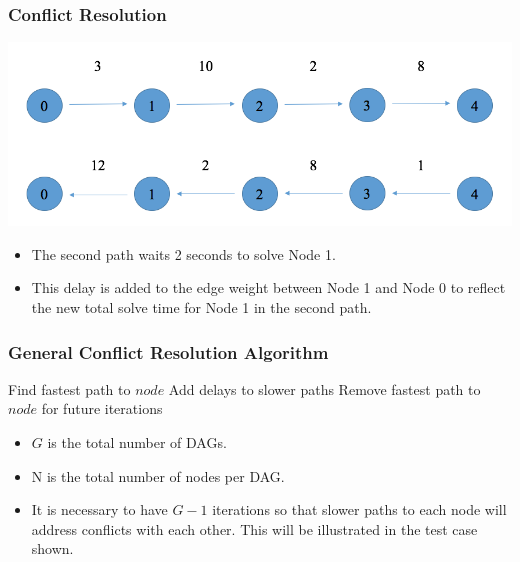 \documentclass[xcolor={usenames,dvipsnames,svgnames,table}]{beamer}
\begin{document}
\begin{frame}[t]\frametitle{Conflict Resolution}
	\centering
	\includegraphics[scale=0.35]{figures/postconflict.png}
	
	\begin{block}{}
	\begin{itemize}
		\item The second path waits 2 seconds to solve Node 1.
		\item This delay is added to the edge weight between Node 1 and Node 0 to reflect the new total solve time for Node 1 in the second path.
	\end{itemize}
	\end{block}
	
\end{frame}

\begin{frame}[t]\frametitle{General Conflict Resolution Algorithm}
\begin{algorithm}[H]
\begin{algorithmic}[1]
\STATE Find fastest path to $node$
\STATE Add delays to slower paths
\STATE Remove fastest path to $node$ for future iterations
\ENDFOR
\ENDFOR	
\label{conflict}
\end{algorithmic}
\end{algorithm}

\begin{block}{}
\begin{itemize}
	\item $G$ is the total number of DAGs.
	\item N is the total number of nodes per DAG.
	\item It is necessary to have $G-1$ iterations so that slower paths to each node will address conflicts with each other. This will be illustrated in the test case shown.
\end{itemize}
\end{block}
\end{frame}
\end{document}
